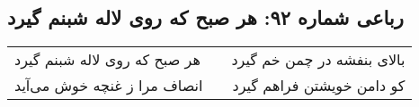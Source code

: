 \begin{center}
\section*{رباعی شماره ۹۲: هر صبح که روی لاله شبنم گیرد}
\label{sec:sh092}
\begin{longtable}{l p{0.5cm} r}
هر صبح که روی لاله شبنم گیرد
&&
بالای بنفشه در چمن خم گیرد
\\
انصاف مرا ز غنچه خوش می‌آید
&&
کو دامن خویشتن فراهم گیرد
\\
\end{longtable}
\end{center}
